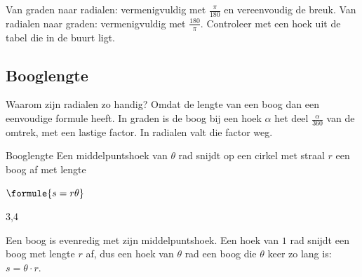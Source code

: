 
\begin{werkwijze}
Van graden naar radialen: vermenigvuldig met $\frac{\pi}{180}$ en vereenvoudig de breuk. Van radialen naar graden: vermenigvuldig met $\frac{180}{\pi}$. Controleer met een hoek uit de tabel die in de buurt ligt.
\end{werkwijze}

\begin{oefeningen}
\end{oefeningen}

\subsection{Booglengte}

Waarom zijn radialen zo handig? Omdat de lengte van een boog dan een eenvoudige formule heeft. In graden is de boog bij een hoek $\alpha$ het deel $\frac{\alpha}{360}$ van de omtrek, met een lastige factor. In radialen valt die factor weg.

\begin{theorie}
\begin{stelling}{Booglengte}
Een middelpuntshoek van $\theta$ rad snijdt op een cirkel met straal $r$ een boog af met lengte

\vspace{1mm}
\qquad $\formule{s = r\theta}$
\end{stelling}
\begin{alleenvoor}{3,4}
\begin{bewijs}
Een boog is evenredig met zijn middelpuntshoek. Een hoek van $1$ rad snijdt een boog met lengte $r$ af, dus een hoek van $\theta$ rad een boog die $\theta$ keer zo lang is: $s = \theta \cdot r$.
\end{bewijs}
\end{alleenvoor}
\end{theorie}

